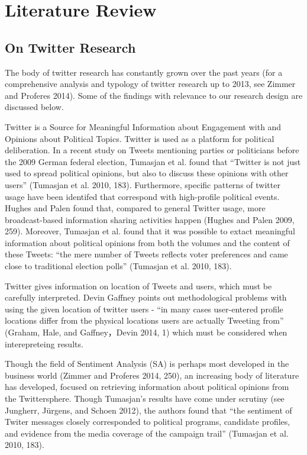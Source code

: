 \documentclass[]{article}
\begin{document}
\section{Literature Review}\label{literature-review}

\subsection{On Twitter Research}\label{on-twitter-research}

The body of twitter research has constantly grown over the past years
(for a comprehensive analysis and typology of twitter research up to
2013, see Zimmer and Proferes 2014). Some of the findings with relevance
to our research design are discussed below.

Twitter is a Source for Meaningful Information about Engagement with and
Opinions about Political Topics. Twitter is used as a platform for
political deliberation. In a recent study on Tweets mentioning parties
or politicians before the 2009 German federal election, Tumasjan et al.
found that ``Twitter is not just used to spread political opinions, but
also to discuss these opinions with other users'' (Tumasjan et al. 2010,
183). Furthermore, specific patterns of twitter usage have been
identifed that correspond with high-profile political events. Hughes and
Palen found that, compared to general Twitter usage, more
broadcast-based information sharing activities happen (Hughes and Palen
2009, 259). Moreover, Tumasjan et al. found that it was possible to
extact meaningful information about political opinions from both the
volumes and the content of these Tweets: ``the mere number of Tweets
reflects voter preferences and came close to traditional election
polls'' (Tumasjan et al. 2010, 183).

Twitter gives information on location of Tweets and users, which must be
carefully interpreted. Devin Gaffney points out methodological problems
with using the given location of twitter users - ``in many cases
user-entered profile locations differ from the physical locations users
are actually Tweeting from'' (Graham, Hale, and Gaffney，Devin 2014, 1)
which must be considered when interepreteing results.

Though the field of Sentiment Analysis (SA) is perhaps most developed in
the business world (Zimmer and Proferes 2014, 250), an increasing body
of literature has developed, focused on retrieving information about
political opinions from the Twittersphere. Though Tumasjan's results
have come under scrutiny (see Jungherr, J{ü}rgens, and Schoen 2012), the
authors found that ``the sentiment of Twiter messages closely
corresponded to political programs, candidate profiles, and evidence
from the media coverage of the campaign trail'' (Tumasjan et al. 2010,
183).
\end{document}
